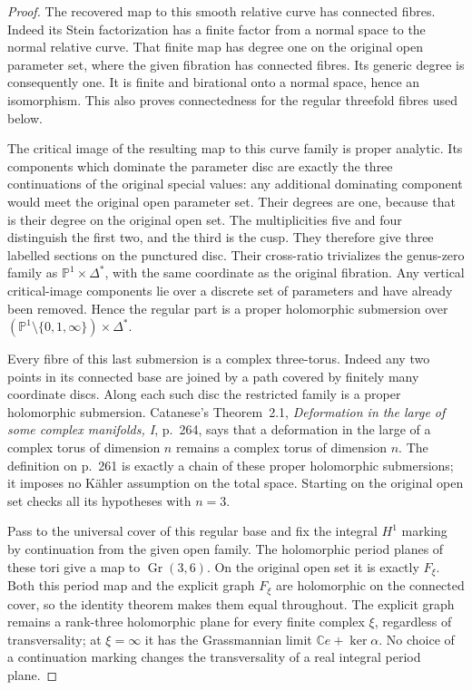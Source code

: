 \begin{proof}
The recovered map to this smooth relative curve has connected
fibres. Indeed its Stein factorization has a finite factor
from a normal space to the normal relative curve. That finite
map has degree one on the original open parameter set, where
the given fibration has connected fibres. Its generic degree
is consequently one. It is finite and birational onto a normal
space, hence an isomorphism. This also proves connectedness
for the regular threefold fibres used below.

The critical image of the resulting map to this curve family
is proper analytic. Its components which dominate the
parameter disc are exactly the three continuations of the
original special values: any additional dominating component
would meet the original open parameter set. Their degrees
are one, because that is their degree on the original open
set. The multiplicities five and four distinguish the first
two, and the third is the cusp. They therefore give three
labelled sections on the punctured disc. Their cross-ratio
trivializes the genus-zero family as
$\mathbb P^1\times\Delta^*$, with the same coordinate as
the original fibration. Any vertical critical-image components
lie over a discrete set of parameters and have already been
removed. Hence the regular part is a proper holomorphic
submersion over
$(\mathbb P^1\setminus\{0,1,\infty\})\times\Delta^*$.

Every fibre of this last submersion is a complex three-torus.
Indeed any two points in its connected base are joined by
a path covered by finitely many coordinate discs. Along
each such disc the restricted family is a proper holomorphic
submersion. Catanese's Theorem~2.1, \emph{Deformation in the
large of some complex manifolds, I}, p.~264, says that a
deformation in the large of a complex torus of dimension
$n$ remains a complex torus of dimension $n$. The definition
on p.~261 is exactly a chain of these proper holomorphic
submersions; it imposes no Kähler assumption on the total
space. Starting on the original open set checks all its
hypotheses with $n=3$.

Pass to the universal cover of this regular base and fix the
integral $H^1$ marking by continuation from the given open
family. The holomorphic period planes of these tori give
a map to $\operatorname{Gr}(3,6)$. On the original open
set it is exactly $F_\xi$. Both this period map and the
explicit graph $F_\xi$ are holomorphic on the connected
cover, so the identity theorem makes them equal throughout.
The explicit graph remains a rank-three holomorphic plane
for every finite complex $\xi$, regardless of transversality;
at $\xi=\infty$ it has the Grassmannian limit
$\mathbb C e+\ker\alpha$. No choice of a continuation
marking changes the transversality of a real integral
period plane.


\end{proof}
